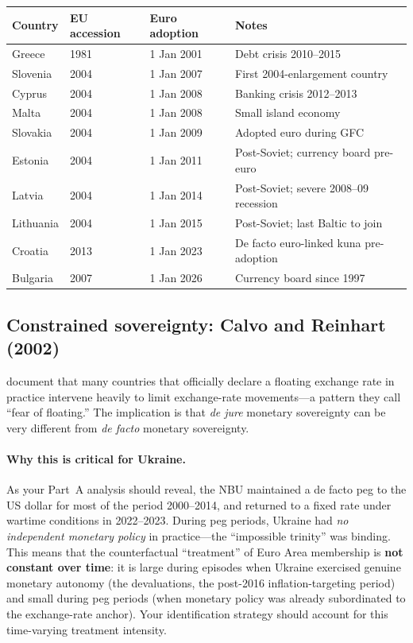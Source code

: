 \documentclass[11pt,a4paper]{article}
\begin{document}
\begin{center}
\small
\begin{tabular}{llll}
\toprule
\textbf{Country} & \textbf{EU accession} & \textbf{Euro adoption} & \textbf{Notes} \\
\midrule
Greece    & 1981  & 1 Jan 2001 & Debt crisis 2010--2015 \\
Slovenia  & 2004  & 1 Jan 2007 & First 2004-enlargement country \\
Cyprus    & 2004  & 1 Jan 2008 & Banking crisis 2012--2013 \\
Malta     & 2004  & 1 Jan 2008 & Small island economy \\
Slovakia  & 2004  & 1 Jan 2009 & Adopted euro during GFC \\
Estonia   & 2004  & 1 Jan 2011 & Post-Soviet; currency board pre-euro \\
Latvia    & 2004  & 1 Jan 2014 & Post-Soviet; severe 2008--09 recession \\
Lithuania & 2004  & 1 Jan 2015 & Post-Soviet; last Baltic to join \\
Croatia   & 2013  & 1 Jan 2023 & De facto euro-linked kuna pre-adoption \\
Bulgaria  & 2007  & 1 Jan 2026 & Currency board since 1997 \\
\bottomrule
\end{tabular}
\end{center}


\subsection*{Constrained sovereignty: Calvo and Reinhart (2002)}

\citet{calvo_reinhart2002} document that many countries that officially declare
a floating exchange rate in practice intervene heavily to limit exchange-rate
movements---a pattern they call ``fear of floating.'' The implication is that
\emph{de jure} monetary sovereignty can be very different from \emph{de facto}
monetary sovereignty.

\paragraph{Why this is critical for Ukraine.}
As your Part~A analysis should reveal, the NBU maintained a de facto peg to the
US dollar for most of the period 2000--2014, and returned to a fixed rate under
wartime conditions in 2022--2023. During peg periods, Ukraine had \emph{no
independent monetary policy} in practice---the ``impossible trinity'' was
binding. This means that the counterfactual ``treatment'' of Euro Area
membership is \textbf{not constant over time}: it is large during episodes when
Ukraine exercised genuine monetary autonomy (the devaluations, the post-2016
inflation-targeting period) and small during peg periods (when monetary policy
was already subordinated to the exchange-rate anchor). Your identification
strategy should account for this time-varying treatment intensity.
\end{document}
